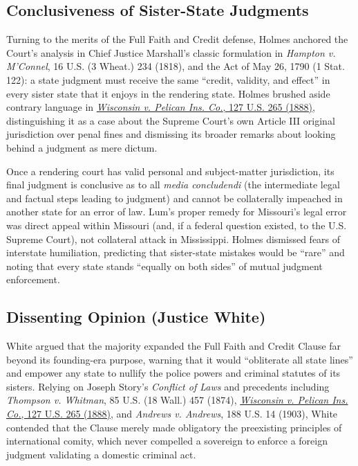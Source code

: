 \documentclass[12pt]{article}
\begin{document}
\subsection{Conclusiveness of Sister-State Judgments}
Turning to the merits of the Full Faith and Credit defense, Holmes anchored the Court's analysis in Chief Justice Marshall's classic formulation in \textit{Hampton v. M'Connel}, 16 U.S. (3 Wheat.) 234 (1818), and the Act of May 26, 1790 (1 Stat. 122): a state judgment must receive the same ``credit, validity, and effect'' in every sister state that it enjoys in the rendering state. Holmes brushed aside contrary language in \href{https://supreme.justia.com/cases/federal/us/127/265/}{\textit{Wisconsin v. Pelican Ins. Co.}, 127 U.S. 265 (1888)}, distinguishing it as a case about the Supreme Court's own Article III original jurisdiction over penal fines and dismissing its broader remarks about looking behind a judgment as mere dictum.

Once a rendering court has valid personal and subject-matter jurisdiction, its final judgment is conclusive as to all \textit{media concludendi} (the intermediate legal and factual steps leading to judgment) and cannot be collaterally impeached in another state for an error of law. Lum's proper remedy for Missouri's legal error was direct appeal within Missouri (and, if a federal question existed, to the U.S. Supreme Court), not collateral attack in Mississippi. Holmes dismissed fears of interstate humiliation, predicting that sister-state mistakes would be ``rare'' and noting that every state stands ``equally on both sides'' of mutual judgment enforcement.

\subsection{Dissenting Opinion (Justice White)}

White argued that the majority expanded the Full Faith and Credit Clause far beyond its founding-era purpose, warning that it would ``obliterate all state lines'' and empower any state to nullify the police powers and criminal statutes of its sisters. Relying on Joseph Story's \textit{Conflict of Laws} and precedents including \textit{Thompson v. Whitman}, 85 U.S. (18 Wall.) 457 (1874), \href{https://supreme.justia.com/cases/federal/us/127/265/}{\textit{Wisconsin v. Pelican Ins. Co.}, 127 U.S. 265 (1888)}, and \textit{Andrews v. Andrews}, 188 U.S. 14 (1903), White contended that the Clause merely made obligatory the preexisting principles of international comity, which never compelled a sovereign to enforce a foreign judgment validating a domestic criminal act.
\end{document}
